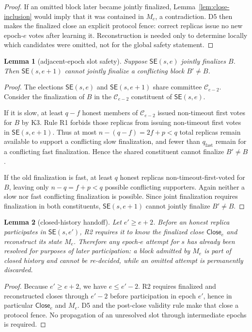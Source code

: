 \documentclass[11pt]{article}
\newtheorem{lemma}{Lemma}
\theoremstyle{remark}
\newcommand{\C}{\mathcal{C}}
\newcommand{\SE}{\mathsf{SE}}
\newcommand{\CE}{\mathsf{Close}}
\begin{document}
\begin{proof}
If an omitted block later became jointly finalized, Lemma~\ref{lem:close-inclusion} would imply that it was contained in $M_e$, a contradiction. D5 then makes the finalized close an explicit protocol fence: correct replicas issue no new epoch-$e$ votes after learning it. Reconstruction is needed only to determine locally which candidates were omitted, not for the global safety statement.
\end{proof}

\begin{lemma}[adjacent-epoch slot safety]
\label{lem:adjacent}
Suppose $\SE(s,e)$ jointly finalizes $B$. Then $\SE(s,e+1)$ cannot jointly finalize a conflicting block $B'\ne B$.
\end{lemma}

\begin{proof}
The elections $\SE(s,e)$ and $\SE(s,e+1)$ share committee $\C_{e-2}$. Consider the finalization of $B$ in the $\C_{e-2}$ constituent of $\SE(s,e)$.

If it is slow, at least $q-f$ honest members of $\C_{e-2}$ issued non-timeout first votes for $B$ by K3. Rule R1 forbids those replicas from issuing non-timeout first votes in $\SE(s,e+1)$. Thus at most $n-(q-f)=2f+p<q$ total replicas remain available to support a conflicting slow finalization, and fewer than $q_{\mathrm{fast}}$ remain for a conflicting fast finalization. Hence the shared constituent cannot finalize $B'\ne B$.

If the old finalization is fast, at least $q$ honest replicas non-timeout-first-voted for $B$, leaving only $n-q=f+p<q$ possible conflicting supporters. Again neither a slow nor fast conflicting finalization is possible. Since joint finalization requires finalization in both constituents, $\SE(s,e+1)$ cannot jointly finalize $B'\ne B$.
\end{proof}

\begin{lemma}[closed-history handoff]
\label{lem:handoff}
Let $e'\ge e+2$. Before an honest replica participates in $\SE(s,e')$, R2 requires it to know the finalized close $\CE_e$ and reconstruct its state $M_e$. Therefore any epoch-$e$ attempt for $s$ has already been resolved for purposes of later participation: a block admitted by $M_e$ is part of closed history and cannot be re-decided, while an omitted attempt is permanently discarded.
\end{lemma}

\begin{proof}
Because $e'\ge e+2$, we have $e\le e'-2$. R2 requires finalized and reconstructed closes through $e'-2$ before participation in epoch $e'$, hence in particular $\CE_e$ and $M_e$. D5 and the post-close validity rule make that close a protocol fence. No propagation of an unresolved slot through intermediate epochs is required.
\end{proof}
\end{document}
